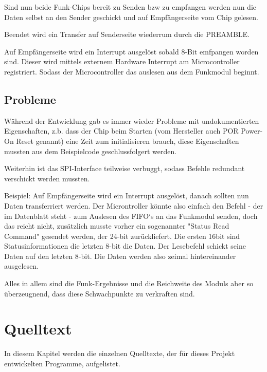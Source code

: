 \documentclass{scrartcl}
\begin{document}
		Sind nun beide Funk-Chips bereit zu Senden bzw zu empfangen werden nun die Daten
		selbst an den Sender geschickt und auf Empfängerseite vom Chip gelesen.

		Beendet wird ein Transfer auf Senderseite wiederrum durch die PREAMBLE.

		Auf Empfängerseite wird ein Interrupt ausgelöst sobald 8-Bit emfpangen worden sind.
		Dieser wird mittels externem Hardware Interrupt am Microcontroller registriert.
		Sodass der Microcontroller das auslesen aus dem Funkmodul beginnt.

	\subsection{Probleme}
		Während der Entwicklung gab es immer wieder Probleme mit undokumentierten Eigenschaften,
		z.b. dass der Chip beim Starten (vom Hersteller auch POR Power-On Reset genannt)
		eine Zeit zum initialisieren brauch, diese Eigenschaften mussten aus dem Beispielcode 
		geschlussfolgert werden.
		
		Weiterhin ist das SPI-Interface teilweise verbuggt, sodass Befehle redundant verschickt 
		werden mussten.
		
		Beispiel:
		Auf Empfängerseite wird ein Interrupt ausgelöst, danach sollten nun Daten transferriert werden.
		Der Microntroller könnte also einfach den Befehl - der im Datenblatt steht - zum Auslesen des FIFO`s
		an das Funkmodul senden, doch das reicht nicht, zusätzlich musste vorher ein sogenannter
		"Status Read Command" gesendet werden, der 24-bit zurückliefert. Die ersten 16bit sind
		Statusinformationen die letzten 8-bit die Daten.
		Der Lesebefehl schickt seine Daten auf den letzten 8-bit. 
		Die Daten werden also zeimal hintereinander ausgelesen.
		
		Alles in allem sind die Funk-Ergebnisse und die Reichweite des Moduls aber so überzeugnend, dass
		diese Schwachpunkte zu verkraften sind.

\newpage

\section{Quelltext}
	In diesem Kapitel werden die einzelnen Quelltexte, der für dieses Projekt entwickelten Programme, aufgelistet.

\lstset{language=C}

\end{document}
